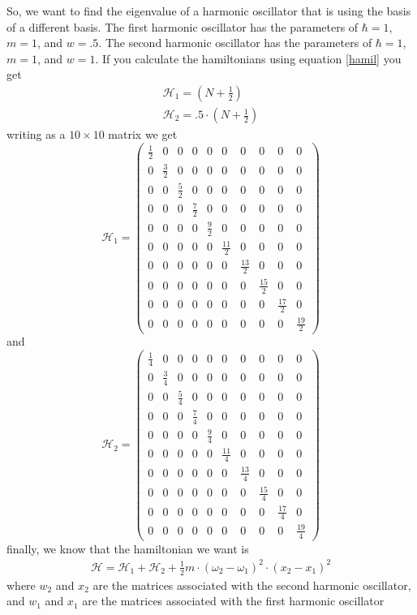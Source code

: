 \documentclass[12pt]{article}
\begin{document}
So, we want to find the eigenvalue of a harmonic oscillator that is using the basis of a different basis. The first harmonic oscillator has the parameters of $\hbar = 1$, $m = 1$, and $w=.5$. The second harmonic oscillator has the parameters of $\hbar = 1$, $m = 1$, and $w=1$. If you calculate the hamiltonians using equation \ref{hamil} you get
\begin{gather}
\mathcal{H}_1 =  (N + \frac{1}{2}) \\
\mathcal{H}_2 =  .5 \cdot(N + \frac{1}{2})
\end{gather}
writing as a $10\times10$ matrix we get
\[ \mathcal{H}_1 = \left( \begin{array}{cccccccccc}
\frac{1}{2} & 0 & 0 & 0 & 0 & 0 & 0 & 0 & 0 & 0\\
0 & \frac{3}{2} & 0 & 0 & 0 & 0 & 0 & 0 & 0 & 0\\
0 & 0 & \frac{5}{2} & 0 & 0 & 0 & 0 & 0 & 0 & 0\\
0 & 0 & 0 & \frac{7}{2} & 0 & 0 & 0 & 0 & 0 & 0\\
0 & 0 & 0 & 0 & \frac{9}{2} & 0 & 0 & 0 & 0 & 0\\
0 & 0 & 0 & 0 & 0 & \frac{11}{2} & 0 & 0 & 0 & 0\\
0 & 0 & 0 & 0 & 0 & 0 & \frac{13}{2} & 0 & 0 & 0\\
0 & 0 & 0 & 0 & 0 & 0 & 0 & \frac{15}{2} & 0 & 0\\
0 & 0 & 0 & 0 & 0 & 0 & 0 & 0 & \frac{17}{2} & 0\\
0 & 0 & 0 & 0 & 0 & 0 & 0 & 0 & 0 & \frac{19}{2} \end{array} \right)\]
and
\[ \mathcal{H}_2 = \left( \begin{array}{cccccccccc}
\frac{1}{4} & 0 & 0 & 0 & 0 & 0 & 0 & 0 & 0 & 0\\
0 & \frac{3}{4} & 0 & 0 & 0 & 0 & 0 & 0 & 0 & 0\\
0 & 0 & \frac{5}{4} & 0 & 0 & 0 & 0 & 0 & 0 & 0\\
0 & 0 & 0 & \frac{7}{4} & 0 & 0 & 0 & 0 & 0 & 0\\
0 & 0 & 0 & 0 & \frac{9}{4} & 0 & 0 & 0 & 0 & 0\\
0 & 0 & 0 & 0 & 0 & \frac{11}{4} & 0 & 0 & 0 & 0\\
0 & 0 & 0 & 0 & 0 & 0 & \frac{13}{4} & 0 & 0 & 0\\
0 & 0 & 0 & 0 & 0 & 0 & 0 & \frac{15}{4} & 0 & 0\\
0 & 0 & 0 & 0 & 0 & 0 & 0 & 0 & \frac{17}{4} & 0\\
0 & 0 & 0 & 0 & 0 & 0 & 0 & 0 & 0 & \frac{19}{4} \end{array} \right)\]
finally, we know that the hamiltonian we want is
\begin{gather}
\mathcal{H} =   \mathcal{H}_1 + \mathcal{H}_2 + \frac{1}{2} m \cdot (\omega_2-\omega_1)^2 \cdot (x_2-x_1)^2
\end{gather}
where $w_2$ and $x_2$ are the matrices associated with the second harmonic oscillator, and $w_1$ and $x_1$ are the matrices associated with the first harmonic oscillator
\end{document}

